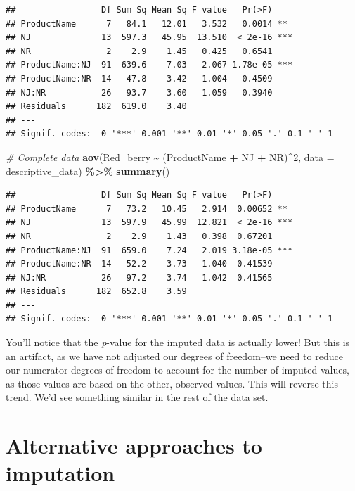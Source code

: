 \documentclass[
]{book}
\newenvironment{Shaded}{\begin{snugshade}}{\end{snugshade}}
\newcommand{\AttributeTok}[1]{\textcolor[rgb]{0.13,0.29,0.53}{#1}}
\newcommand{\CommentTok}[1]{\textcolor[rgb]{0.56,0.35,0.01}{\textit{#1}}}
\newcommand{\DecValTok}[1]{\textcolor[rgb]{0.00,0.00,0.81}{#1}}
\newcommand{\FunctionTok}[1]{\textcolor[rgb]{0.13,0.29,0.53}{\textbf{#1}}}
\newcommand{\NormalTok}[1]{#1}
\newcommand{\SpecialCharTok}[1]{\textcolor[rgb]{0.81,0.36,0.00}{\textbf{#1}}}
\begin{document}
\begin{verbatim}
##                 Df Sum Sq Mean Sq F value   Pr(>F)    
## ProductName      7   84.1   12.01   3.532   0.0014 ** 
## NJ              13  597.3   45.95  13.510  < 2e-16 ***
## NR               2    2.9    1.45   0.425   0.6541    
## ProductName:NJ  91  639.6    7.03   2.067 1.78e-05 ***
## ProductName:NR  14   47.8    3.42   1.004   0.4509    
## NJ:NR           26   93.7    3.60   1.059   0.3940    
## Residuals      182  619.0    3.40                     
## ---
## Signif. codes:  0 '***' 0.001 '**' 0.01 '*' 0.05 '.' 0.1 ' ' 1
\end{verbatim}

\begin{Shaded}
\begin{Highlighting}[]
\CommentTok{\# Complete data}
\FunctionTok{aov}\NormalTok{(Red\_berry }\SpecialCharTok{\textasciitilde{}}\NormalTok{ (ProductName }\SpecialCharTok{+}\NormalTok{ NJ }\SpecialCharTok{+}\NormalTok{ NR)}\SpecialCharTok{\^{}}\DecValTok{2}\NormalTok{, }
    \AttributeTok{data =}\NormalTok{ descriptive\_data) }\SpecialCharTok{\%\textgreater{}\%}
  \FunctionTok{summary}\NormalTok{()}
\end{Highlighting}
\end{Shaded}

\begin{verbatim}
##                 Df Sum Sq Mean Sq F value   Pr(>F)    
## ProductName      7   73.2   10.45   2.914  0.00652 ** 
## NJ              13  597.9   45.99  12.821  < 2e-16 ***
## NR               2    2.9    1.43   0.398  0.67201    
## ProductName:NJ  91  659.0    7.24   2.019 3.18e-05 ***
## ProductName:NR  14   52.2    3.73   1.040  0.41539    
## NJ:NR           26   97.2    3.74   1.042  0.41565    
## Residuals      182  652.8    3.59                     
## ---
## Signif. codes:  0 '***' 0.001 '**' 0.01 '*' 0.05 '.' 0.1 ' ' 1
\end{verbatim}

You'll notice that the \emph{p}-value for the imputed data is actually lower! But this is an artifact, as we have not adjusted our degrees of freedom--we need to reduce our numerator degrees of freedom to account for the number of imputed values, as those values are based on the other, observed values. This will reverse this trend. We'd see something similar in the rest of the data set.

\section{Alternative approaches to imputation}\label{alternative-approaches-to-imputation}
\end{document}

